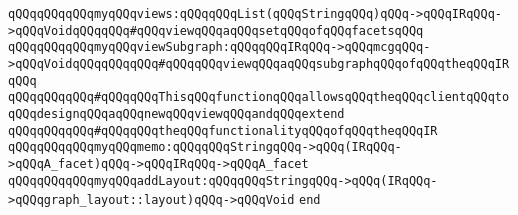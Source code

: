 \verb|qQQqqQQqqQQqmyqQQqviews:qQQqqQQqList(qQQqStringqQQq)qQQq->qQQqIRqQQq->qQQqVoidqQQqqQQq#qQQqviewqQQqaqQQqsetqQQqofqQQqfacetsqQQq|\newline
\verb|qQQqqQQqqQQqmyqQQqviewSubgraph:qQQqqQQqIRqQQq->qQQqmcgqQQq->qQQqVoidqQQqqQQqqQQq#qQQqqQQqviewqQQqaqQQqsubgraphqQQqofqQQqtheqQQqIRqQQq|\newline
\newline
\newline
\verb|qQQqqQQqqQQq#qQQqqQQqThisqQQqfunctionqQQqallowsqQQqtheqQQqclientqQQqtoqQQqdesignqQQqaqQQqnewqQQqviewqQQqandqQQqextend|\newline
\verb|qQQqqQQqqQQq#qQQqqQQqtheqQQqfunctionalityqQQqofqQQqtheqQQqIR|\newline
\newline
\verb|qQQqqQQqqQQqmyqQQqmemo:qQQqqQQqStringqQQq->qQQq(IRqQQq->qQQqA_facet)qQQq->qQQqIRqQQq->qQQqA_facet|\newline
\verb|qQQqqQQqqQQqmyqQQqaddLayout:qQQqqQQqStringqQQq->qQQq(IRqQQq->qQQqgraph_layout::layout)qQQq->qQQqVoid|\newline
\newline
\verb|end|\newline
\newline

